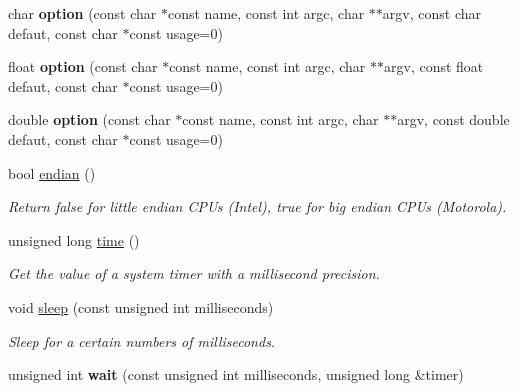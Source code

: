 \begin{DoxyCompactItemize}
\item 
\hypertarget{namespacecimg__library_1_1cimg_a4b757cc5b4b0b18cf0172a119ae051f4}{
char {\bfseries option} (const char $\ast$const name, const int argc, char $\ast$$\ast$argv, const char defaut, const char $\ast$const usage=0)}
\label{namespacecimg__library_1_1cimg_a4b757cc5b4b0b18cf0172a119ae051f4}

\item 
\hypertarget{namespacecimg__library_1_1cimg_a15498c55ec48427f40c670957db9c753}{
float {\bfseries option} (const char $\ast$const name, const int argc, char $\ast$$\ast$argv, const float defaut, const char $\ast$const usage=0)}
\label{namespacecimg__library_1_1cimg_a15498c55ec48427f40c670957db9c753}

\item 
\hypertarget{namespacecimg__library_1_1cimg_ab12edc81400022b47ff1171658adadec}{
double {\bfseries option} (const char $\ast$const name, const int argc, char $\ast$$\ast$argv, const double defaut, const char $\ast$const usage=0)}
\label{namespacecimg__library_1_1cimg_ab12edc81400022b47ff1171658adadec}

\item 
\hypertarget{namespacecimg__library_1_1cimg_ac01790460808876967d2ba371a000cee}{
bool \hyperlink{namespacecimg__library_1_1cimg_ac01790460808876967d2ba371a000cee}{endian} ()}
\label{namespacecimg__library_1_1cimg_ac01790460808876967d2ba371a000cee}

\begin{DoxyCompactList}\small\item\em Return {\ttfamily false} for little endian CPUs (Intel), {\ttfamily true} for big endian CPUs (Motorola). \item\end{DoxyCompactList}\item 
\hypertarget{namespacecimg__library_1_1cimg_af883131bbc64e996d212114cc2b2b21a}{
unsigned long \hyperlink{namespacecimg__library_1_1cimg_af883131bbc64e996d212114cc2b2b21a}{time} ()}
\label{namespacecimg__library_1_1cimg_af883131bbc64e996d212114cc2b2b21a}

\begin{DoxyCompactList}\small\item\em Get the value of a system timer with a millisecond precision. \item\end{DoxyCompactList}\item 
void \hyperlink{namespacecimg__library_1_1cimg_a3ac7655e49556a90715f3532af221334}{sleep} (const unsigned int milliseconds)
\begin{DoxyCompactList}\small\item\em Sleep for a certain numbers of milliseconds. \item\end{DoxyCompactList}\item 
\hypertarget{namespacecimg__library_1_1cimg_a011234136eeddefb37bb8d1e1f74cac3}{
unsigned int {\bfseries wait} (const unsigned int milliseconds, unsigned long \&timer)}
\label{namespacecimg__library_1_1cimg_a011234136eeddefb37bb8d1e1f74cac3}


\end{DoxyCompactItemize}
